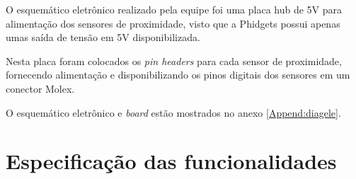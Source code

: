 O esquemático eletrônico realizado pela equipe foi uma placa hub de 5V para alimentação dos sensores de proximidade, visto que a Phidgets possui apenas umas saída de tensão em 5V disponibilizada.

 Nesta placa foram colocados os \textit{pin headers} para cada sensor de proximidade, fornecendo alimentação e disponibilizando os pinos digitais dos sensores em um conector Molex.

O esquemático eletrônico e \textit{board} estão mostrados no anexo \ref{Append:diagele}.


\section{Especificação das funcionalidades}
\label{sec:espf}
%
%
%

